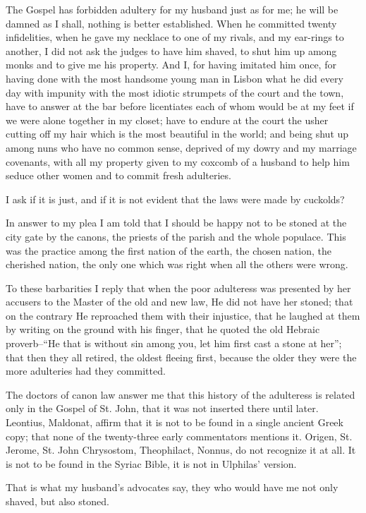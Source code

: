 The Gospel has forbidden adultery for my husband just as for me; he will
be damned as I shall, nothing is better established. When he committed
twenty infidelities, when he gave my necklace to one of my rivals, and
my ear-rings to another, I did not ask the judges to have him shaved, to
shut him up among monks and to give me his property. And I, for having
imitated him once, for having done with the most handsome young man in
Lisbon what he did every day with impunity with the most idiotic
strumpets of the court and the town, have to answer at the bar before
licentiates each of whom would be at my feet if we were alone together
in my closet; have to endure at the court the usher cutting off my hair
which is the most beautiful in the world; and being shut up among nuns
who have no common sense, deprived of my dowry and my marriage
covenants, with all my property given to my coxcomb of a husband to help
him seduce other women and to commit fresh adulteries.

I ask if it is just, and if it is not evident that the laws were made by
cuckolds?

In answer to my plea I am told that I should be happy not to be stoned
at the city gate by the canons, the priests of the parish and the whole
populace. This was the practice among the first nation of the earth, the
chosen nation, the cherished nation, the only one which was right when
all the others were wrong.

To these barbarities I reply that when the poor adulteress was presented
by her accusers to the Master of the old and new law, He did not have
her stoned; that on the contrary He reproached them with their
injustice, that he laughed at them by writing on the ground with his
finger, that he quoted the old Hebraic proverb--\enquote{He that is without sin
among you, let him first cast a stone at her}; that then they all
retired, the oldest fleeing first, because the older they were the more
adulteries had they committed.

The doctors of canon law answer me that this history of the adulteress
is related only in the Gospel of St. John, that it was not inserted
there until later. Leontius, Maldonat, affirm that it is not to be found
in a single ancient Greek copy; that none of the twenty-three early
commentators mentions it. Origen, St. Jerome, St. John Chrysostom,
Theophilact, Nonnus, do not recognize it at all. It is not to be found
in the Syriac Bible, it is not in Ulphilas' version.

That is what my husband's advocates say, they who would have me not only
shaved, but also stoned.

